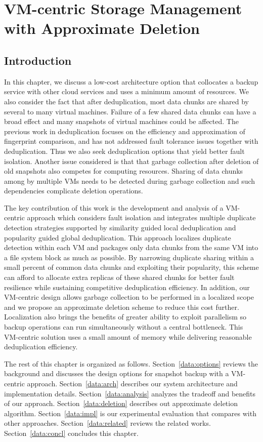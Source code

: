 \chapter{VM-centric Storage Management with Approximate Deletion}
\label{chap:data}
\section{Introduction}
\label{data:intro}
In this chapter, we discuss a low-cost architecture option that collocates
a backup service with other cloud services and uses a minimum amount of resources. 
We also consider the fact that after
deduplication, most data chunks are shared by several to many virtual machines.
Failure of a few shared data chunks can have a 
broad effect and many
snapshots of virtual machines could be affected.
The previous work in deduplication focuses on the efficiency and approximation of
fingerprint comparison, and has not addressed fault tolerance issues  together with deduplication.
Thus we also seek deduplication options that yield better fault isolation.
Another issue considered is that
that garbage collection after deletion of old snapshots also competes for computing resources. 
Sharing of data chunks among by multiple VMs needs to be detected during
garbage collection and such dependencies complicate deletion operations. 

The key contribution of this work is the development and analysis of a VM-centric approach
which considers fault isolation and integrates multiple duplicate detection strategies
supported by similarity guided local deduplication
and popularity guided global deduplication. 
This approach localizes duplicate detection within each VM  
and packages only data chunks from the same VM into a file system block as much as possible.
By narrowing duplicate sharing within a small percent of common data chunks and exploiting their popularity,
this scheme can afford to allocate extra replicas of these shared chunks for better
fault resilience while sustaining competitive deduplication efficiency.
In addition, our VM-centric design allows garbage collection to be performed in a localized
scope and we propose an approximate deletion scheme to reduce this cost further.
Localization also brings the benefits of greater ability to exploit parallelism so
backup operations can run simultaneously without a central  bottleneck.
This VM-centric solution uses a small amount of  memory while delivering reasonable deduplication efficiency. 

The rest of this chapter is organized as follows.
Section~\ref{data:options} reviews the background and discusses the design options for snapshot backup 
with a VM-centric approach. 
Section~\ref{data:arch} describes our system architecture and implementation details.
Section~\ref{data:analysis} analyzes the tradeoff and benefits of our approach. 
Section~\ref{data:deletion} describes out approximate deletion algorithm.
Section~\ref{data:impl} is our experimental evaluation that compares with other approaches.
Section~\ref{data:related} reviews the related works.
Section~\ref{data:concl} concludes this chapter.

